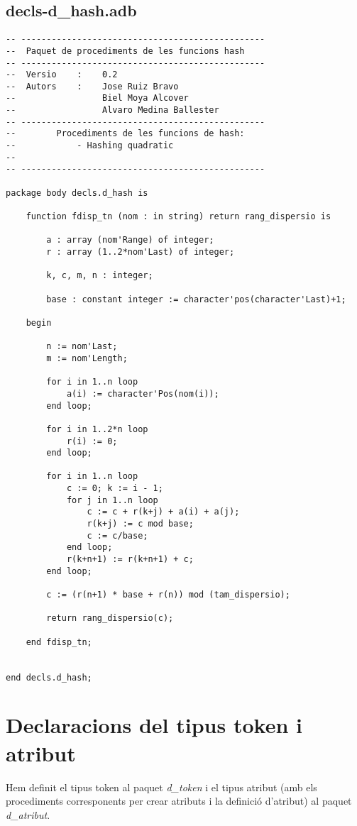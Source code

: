 \documentclass[10pt]{report}
\begin{document}
    \section{decls-d\_hash.adb}
    \begin{lstlisting}[style=Ada]
-- ------------------------------------------------
--  Paquet de procediments de les funcions hash
-- ------------------------------------------------
--  Versio    :    0.2
--  Autors    :    Jose Ruiz Bravo
--                 Biel Moya Alcover
--                 Alvaro Medina Ballester
-- ------------------------------------------------
--        Procediments de les funcions de hash:
--            - Hashing quadratic
--
-- ------------------------------------------------

package body decls.d_hash is

    function fdisp_tn (nom : in string) return rang_dispersio is
        
        a : array (nom'Range) of integer;
        r : array (1..2*nom'Last) of integer;
        
        k, c, m, n : integer;
        
        base : constant integer := character'pos(character'Last)+1;
        
    begin
        
        n := nom'Last;
        m := nom'Length;
    
        for i in 1..n loop
            a(i) := character'Pos(nom(i));
        end loop;
        
        for i in 1..2*n loop
            r(i) := 0;
        end loop;
        
        for i in 1..n loop
            c := 0; k := i - 1;
            for j in 1..n loop
                c := c + r(k+j) + a(i) + a(j);
                r(k+j) := c mod base;
                c := c/base;
            end loop;
            r(k+n+1) := r(k+n+1) + c;
        end loop;
        
        c := (r(n+1) * base + r(n)) mod (tam_dispersio);
        
        return rang_dispersio(c);
        
    end fdisp_tn;
    
    
end decls.d_hash;
    \end{lstlisting}
    \newpage
    
    
    \chapter{Declaracions del tipus token i atribut}
        Hem definit el tipus token al paquet \textit{d\_token} i el tipus atribut (amb els procediments corresponents per crear atributs i la definició d'atribut) al paquet \textit{d\_atribut}.
\end{document}
